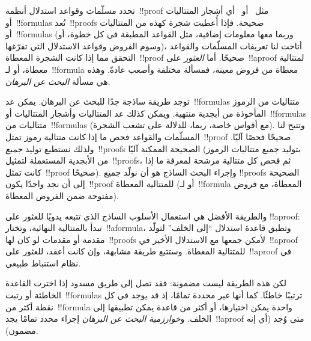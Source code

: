 \documentclass[../../../include/open-logic-section]{subfiles}
\begin{document}


تحدد مسلّمات وقواعد استدلال أنظمة~!!{proof} مثل~ أو~
أي أشجار المتتاليات أو~!!{formula}s تُعد~!!{proof}s صحيحة. فإذا أُعطيت شجرة
كهذه من المتتاليات أو~!!{formula}s (وربما معها معلومات إضافية، مثل القواعد
المطبقة في كل خطوة، أو وسوم الفروض وقواعد الاستدلال التي تفرّغها)، أتاحت لنا
تعريفات المسلّمات والقواعد التحقق مما إذا كانت الشجرة المعطاة~!!{proof}
صحيحًا. أما \emph{العثور} على~!!a{proof} لمتتالية معطاة، أو لـ~!!{formula}
معطاة من فروض معينة، فمسألة مختلفة وأصعب عادةً. وهذه هي مسألة \emph{البحث
عن البرهان}.

توجد طريقة ساذجة جدًا للبحث عن البرهان. يمكن عد~!!{formula}s متتاليات من
الرموز المأخوذة من أبجدية منتهية. ويمكن كذلك عد المتتاليات وأشجار
المتتاليات أو~!!{formula}s متتاليات من~!!{formula}s (مع أقواس خاصة، ربما،
للدلالة على تشعب الشجرة). وتتيح لنا المسلّمات والقواعد فحص ما إذا كانت
متتالية رموز تمثل~!!{proof} صحيحًا فحصًا آليًا. ولذلك نستطيع توليد
\emph{جميع}~!!{proof}s الصحيحة الممكنة آليًا (بتوليد جميع متتاليات الرموز
من الأبجدية المستعملة لتمثيل~!!{proof}s، ثم فحص كل متتالية مرشحة لمعرفة ما
إذا كانت تمثل~!!{proof} صحيحًا). وإجراء البحث الساذج هو أن نولّد جميع
!!{proof}s الصحيحة إلى أن نجد واحدًا يكون~!!{proof} للمتتالية المعطاة (أو
لـ~!!{formula} المعطاة، مع فروض مفتوحة ضمن الفروض المعطاة).

والطريقة الأفضل هي استعمال الأسلوب الساذج الذي تتبعه يدويًا للعثور على
!!a{proof}: تبدأ بالمتتالية النهائية، وتختار~!!a{formula}، وتطبق قاعدة
استدلال ``إلى الخلف'' لتولّد مقدمة أو مقدمات لو كان لها~!!{proof}s لأمكن
جمعها مع الاستدلال الأخير في~!!a{proof} للمتتالية المعطاة. وستتبع طريقة
مشابهة، وإن كانت أعقد، للعثور على~!!a{proof} في نظام استنباط طبيعي.

لكن هذه الطريقة ليست مضمونة: فقد تصل إلى طريق مسدود إذا اخترت القاعدة
الخاطئة أو رتبت~!!{formula}s ترتيبًا خاطئًا. كما أنها غير محددة تمامًا، إذ
قد يوجد في كل نقطة أكثر من~!!{formula} واحدة يمكن اختيارها، أو أكثر من
قاعدة يمكن تطبيقها إلى الخلف. و\emph{خوارزمية البحث عن البرهان} إجراء محدد
تمامًا يجد~!!a{proof} متى وُجد (أي إنه مضمون).
\end{document}
